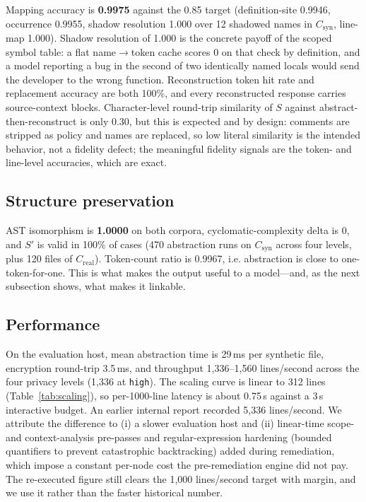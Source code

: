 \documentclass[conference]{IEEEtran}
\begin{document}
Mapping accuracy is \textbf{0.9975} against the 0.85 target
(definition-site 0.9946, occurrence 0.9955, shadow resolution 1.000 over
12 shadowed names in $C_{\text{syn}}$, line-map 1.000). Shadow resolution
of 1.000 is the concrete payoff of the scoped symbol table: a flat
name$\rightarrow$token cache scores 0 on that check by definition, and a
model reporting a bug in the second of two identically named locals would
send the developer to the wrong function. Reconstruction token hit rate
and replacement accuracy are both 100\%, and every reconstructed response
carries source-context blocks. Character-level round-trip similarity of
$S$ against abstract-then-reconstruct is only 0.30, but this is expected
and by design: comments are stripped as policy and names are replaced, so
low literal similarity is the intended behavior, not a fidelity defect;
the meaningful fidelity signals are the token- and line-level accuracies,
which are exact.

\subsection{Structure preservation}

AST isomorphism is \textbf{1.0000} on both corpora, cyclomatic-complexity
delta is 0, and $S'$ is valid in 100\% of cases (470 abstraction runs on
$C_{\text{syn}}$ across four levels, plus 120 files of $C_{\text{real}}$).
Token-count ratio is 0.9967, i.e. abstraction is close to
one-token-for-one. This is what makes the output useful to a model---and,
as the next subsection shows, what makes it linkable.

\subsection{Performance}
\label{sec:perf}

On the evaluation host, mean abstraction time is 29\,ms per
synthetic file, encryption round-trip 3.5\,ms, and throughput
1{,}336--1{,}560 lines/second across the four privacy levels (1{,}336 at
\texttt{high}). The scaling curve is linear to 312 lines
(Table~\ref{tab:scaling}), so per-1000-line latency is about 0.75\,s
against a 3\,s interactive budget. An earlier internal report recorded
5{,}336 lines/second. We attribute the difference to (i) a slower
evaluation host and (ii) linear-time scope- and context-analysis
pre-passes and regular-expression hardening (bounded quantifiers to
prevent catastrophic backtracking) added during remediation, which impose
a constant per-node cost the pre-remediation engine did not pay. The
re-executed figure still clears the 1{,}000 lines/second target with
margin, and we use it rather than the faster historical number.
\end{document}
